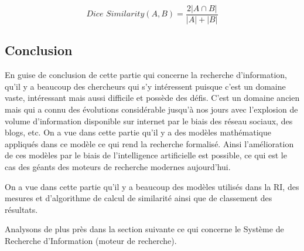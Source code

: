 \[
    \textit{Dice Similarity}(A, B) = \frac{2 |A \cap B|}{|A| + |B|}
\]

\subsection{Conclusion}
En guise de conclusion de cette partie qui concerne la recherche d'information, qu'il y a beaucoup des chercheurs qui s'y intéressent puisque c'est un domaine vaste, intéressant mais aussi difficile et possède des défis. C'est un domaine ancien mais qui a connu des évolutions considérable jusqu’à nos jours avec l'explosion de volume d'information disponible sur internet par le biais des réseau sociaux, des blogs, etc. On a vue dans cette partie qu'il y a des modèles mathématique appliqués dans ce modèle ce qui rend la recherche formalisé. Ainsi l'amélioration de ces modèles par le biais de l’intelligence artificielle est possible, ce qui est le cas des géants des moteurs de recherche modernes aujourd'hui.

On a vue dans cette partie qu'il y a beaucoup des modèles utilisés dans la RI, des mesures et d'algorithme de calcul de similarité ainsi que de classement des résultats.

Analysons de plus près dans la section suivante ce qui concerne le Système de Recherche d'Information (moteur de recherche).
